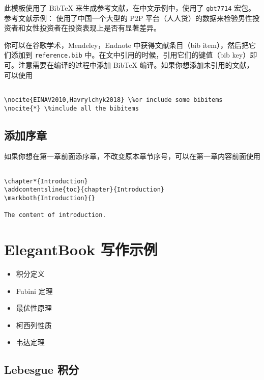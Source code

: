 \documentclass[cn,11pt,fancy,hide]{elegantbook}
\providecommand{\tightlist}{%
  \setlength{\itemsep}{0pt}\setlength{\parskip}{0pt}}
\begin{document}
此模板使用了 BibTeX 来生成参考文献，在中文示例中，使用了 \texttt{gbt7714} 宏包。参考文献示例： 使用了中国一个大型的 P2P 平台（人人贷）的数据来检验男性投资者和女性投资者在投资表现上是否有显著差异。

你可以在谷歌学术，Mendeley，Endnote 中获得文献条目（bib item），然后把它们添加到 \texttt{reference.bib} 中。在文中引用的时候，引用它们的键值（bib key）即可。注意需要在编译的过程中添加 BibTeX 编译。如果你想添加未引用的文献，可以使用

\begin{lstlisting}

\nocite{EINAV2010,Havrylchyk2018} \%or include some bibitems
\nocite{*} \%include all the bibitems

\end{lstlisting}

\hypertarget{section-10}{%
\section{添加序章}\label{section-10}}

如果你想在第一章前面添序章，不改变原本章节序号，可以在第一章内容前面使用

\begin{lstlisting}

\chapter*{Introduction}
\addcontentsline{toc}{chapter}{Introduction} 
\markboth{Introduction}{}

The content of introduction.

\end{lstlisting}

\hypertarget{elegantbook--2}{%
\chapter{ElegantBook 写作示例}\label{elegantbook--2}}

\begin{itemize}
\tightlist
\item
  积分定义
\item
  Fubini 定理
\item
  最优性原理
\item
  柯西列性质
\item
  韦达定理
\end{itemize}

\hypertarget{lebesgue-}{%
\section{Lebesgue 积分}\label{lebesgue-}}
\end{document}
